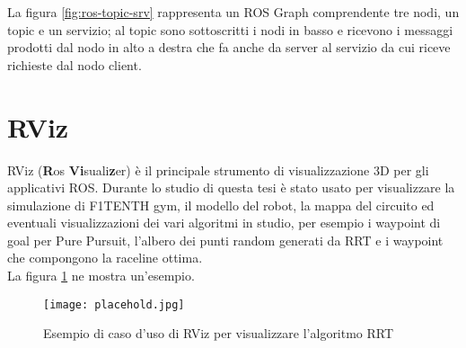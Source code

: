 \bigskip

La figura \ref{fig:ros-topic-srv} rappresenta un ROS Graph comprendente tre nodi, un topic e un servizio;
al topic sono sottoscritti i nodi in basso e ricevono i messaggi prodotti dal nodo in alto a destra che
fa anche da server al servizio da cui riceve richieste dal nodo client.

\section{RViz}
RViz (\textbf{R}os \textbf{Vi}suali\textbf{z}er) è il principale strumento di visualizzazione 3D per gli
applicativi ROS. Durante lo studio di questa tesi è stato usato per visualizzare la simulazione di
F1TENTH gym, il modello del robot, la mappa del circuito ed eventuali visualizzazioni dei vari algoritmi
in studio, per esempio i waypoint di goal per Pure Pursuit, l'albero dei punti random generati da RRT e i
waypoint che compongono la raceline ottima.\\
La figura \ref{fig:rviz-example} ne mostra un'esempio.

\begin{figure}[H]
	\centering
	\texttt{[image: placehold.jpg]}
	\caption{Esempio di caso d'uso di RViz per visualizzare l'algoritmo RRT}
	\label{fig:rviz-example}
\end{figure}
